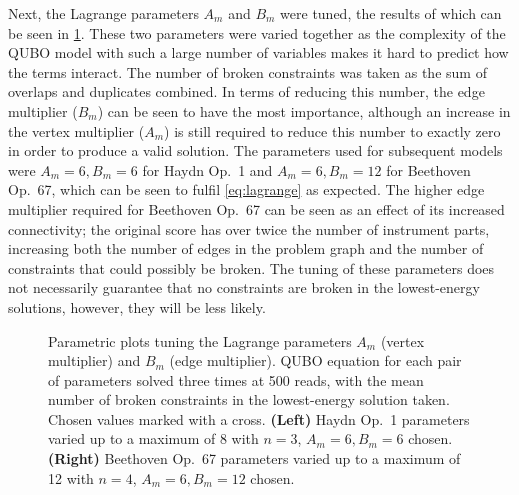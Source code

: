 \documentclass[12pt]{article}
\theoremstyle{definition}
\begin{document}
Next, the Lagrange parameters $A_m$ and $B_m$ were tuned, the results of which can be seen in \cref{fig:lagrange}. These two parameters were varied together as the complexity of the QUBO model with such a large number of variables makes it hard to predict how the terms interact.
The number of broken constraints was taken as the sum of overlaps and duplicates combined. In terms of reducing this number, the edge multiplier ($B_m$) can be seen to have the most importance, although an increase in the vertex multiplier ($A_m$) is still required to reduce this number to exactly zero in order to produce a valid solution. The parameters used for subsequent models were $A_m=6,B_m=6$ for Haydn Op.\ 1 and $A_m=6,B_m=12$ for Beethoven Op.\ 67, which can be seen to fulfil \cref{eq:lagrange} as expected. The higher edge multiplier required for Beethoven Op.\ 67 can be seen as an effect of its increased connectivity; the original score has over twice the number of instrument parts, increasing both the number of edges in the problem graph and the number of constraints that could possibly be broken. The tuning of these parameters does not necessarily guarantee that no constraints are broken in the lowest-energy solutions, however, they will be less likely.

\begin{figure}[!b]
    \centering\footnotesize
    
    \caption{Parametric plots tuning the Lagrange parameters $A_m$ (vertex multiplier) and $B_m$ (edge multiplier). QUBO equation for each pair of parameters solved three times at \num{500} reads, with the mean number of broken constraints in the lowest-energy solution taken. Chosen values marked with a cross. \textbf{(Left)} Haydn Op.\ 1 parameters varied up to a maximum of \num{8} with $n=3$, $A_m=6,B_m=6$ chosen. \textbf{(Right)} Beethoven Op.\ 67 parameters varied up to a maximum of \num{12} with $n=4$, $A_m=6,B_m=12$ chosen.}
    \label{fig:lagrange}
\end{figure}
\end{document}
